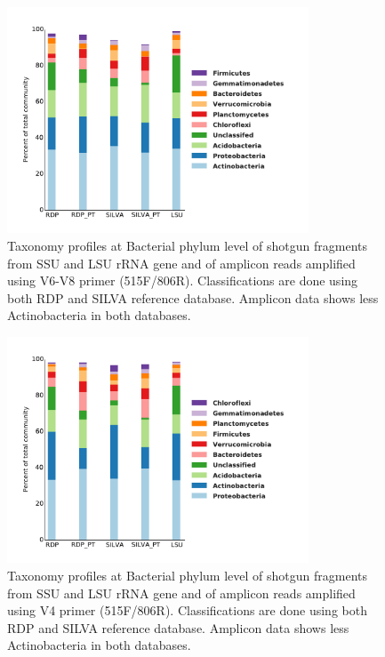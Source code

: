 \documentclass[12pt]{article}
\begin{document}
\begin{figure}[tbph!]
  \centering
  \includegraphics[width=0.8\textwidth]{figs/V6to8_SB1_taxa}
  \caption[Taxonomy profiles at Bacterial phylum level of shotgun fragments and of amplicon reads amplified using V6-V8 primer]{Taxonomy profiles at Bacterial phylum level of shotgun fragments from SSU and LSU rRNA gene and of amplicon reads amplified using V6-V8 primer (515F/806R). Classifications are done using both RDP and SILVA reference database. Amplicon data shows less Actinobacteria in both databases.}
  \label{fig:V6to8_SB1_taxa}
\end{figure}

\begin{figure}[tbph!]
  \centering
  \includegraphics[width=0.8\textwidth]{figs/V4_M1_taxa}
  \caption[Taxonomy profiles at Bacterial phylum level of shotgun fragments  and of amplicon reads amplified using V4 primer]{Taxonomy profiles at Bacterial phylum level of shotgun fragments from SSU and LSU rRNA gene and of amplicon reads amplified using V4 primer (515F/806R). Classifications are done using both RDP and SILVA reference database. Amplicon data shows less Actinobacteria in both databases.}
  \label{fig:V4_M1_taxa}
\end{figure}
\end{document}
